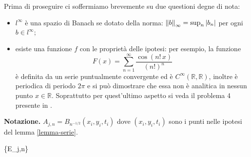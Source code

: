 \begin{remark}
Prima di proseguire ci soffermiamo brevemente su due questioni degne di nota:
\begin{itemize}
\item
$l^{\infty}$ è una spazio di Banach se dotato della norma: $\left\lVert b\right\rVert_\infty=\sup_n|b_n|$ per ogni $b \in l^{\infty}$;
\item
esiste una funzione $f$ con le proprietà delle ipotesi: per esempio, la funzione $$F(x)=\sum_{n=1}^\infty\frac{\cos(n!\,x)}{(n!)^n}$$ è definita da un serie puntualmente convergente ed è $C^{\infty}(\mathbb{R},\mathbb{R})$, inoltre è periodica di periodo $2\pi$ e si può dimostrare che essa non è analitica in nessun punto $x\in\mathbb{R}$. Soprattutto per quest'ultimo aspetto si veda il problema 4 presente in \cite[cap.3]{John}.
\end{itemize}
\end{remark}
\textbf{Notazione.} $A_{j,n} = B_{n^{-1/2}}(x_i,y_i,t_i)$ dove $(x_i,y_i,t_i)$ sono i punti nelle ipotesi del lemma \ref{lemma-serie}.
\begin{lemma}\label{lemma-e}
{\{E_{j,n}\} }
\end{lemma}

